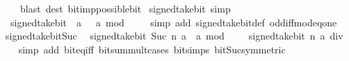 \begin{isabellebody}
\ \ \ \ {\isacharparenleft}{\kern0pt}blast\ dest{\isacharcolon}{\kern0pt}\ bit{\isacharunderscore}{\kern0pt}imp{\isacharunderscore}{\kern0pt}possible{\isacharunderscore}{\kern0pt}bit{\isacharparenright}{\kern0pt}%
\endisatagproof
{\isafoldproof}%
%
\isadelimproof
\isanewline
%
\endisadelimproof
\isanewline
{}\isamarkupfalse%
\ signed{\isacharunderscore}{\kern0pt}take{\isacharunderscore}{\kern0pt}bit{\isacharunderscore}{\kern0pt}{}\ {\isacharbrackleft}{\kern0pt}simp{\isacharbrackright}{\kern0pt}{\isacharcolon}{\kern0pt}\isanewline
\ \ {\isacartoucheopen}signed{\isacharunderscore}{\kern0pt}take{\isacharunderscore}{\kern0pt}bit\ {}\ a\ {\isacharequal}{\kern0pt}\ {\isacharminus}{\kern0pt}\ {\isacharparenleft}{\kern0pt}a\ mod\ {}{\isacharparenright}{\kern0pt}{\isacartoucheclose}\isanewline
%
\isadelimproof
\ \ %
\endisadelimproof
%
\isatagproof
{}\isamarkupfalse%
\ {\isacharparenleft}{\kern0pt}simp\ add{\isacharcolon}{\kern0pt}\ signed{\isacharunderscore}{\kern0pt}take{\isacharunderscore}{\kern0pt}bit{\isacharunderscore}{\kern0pt}def\ odd{\isacharunderscore}{\kern0pt}iff{\isacharunderscore}{\kern0pt}mod{\isacharunderscore}{\kern0pt}{}{\isacharunderscore}{\kern0pt}eq{\isacharunderscore}{\kern0pt}one{\isacharparenright}{\kern0pt}%
\endisatagproof
{\isafoldproof}%
%
\isadelimproof
\isanewline
%
\endisadelimproof
\isanewline
{}\isamarkupfalse%
\ signed{\isacharunderscore}{\kern0pt}take{\isacharunderscore}{\kern0pt}bit{\isacharunderscore}{\kern0pt}Suc{\isacharcolon}{\kern0pt}\isanewline
\ \ {\isacartoucheopen}signed{\isacharunderscore}{\kern0pt}take{\isacharunderscore}{\kern0pt}bit\ {\isacharparenleft}{\kern0pt}Suc\ n{\isacharparenright}{\kern0pt}\ a\ {\isacharequal}{\kern0pt}\ a\ mod\ {}\ {\isacharplus}{\kern0pt}\ {}\ {\isacharasterisk}{\kern0pt}\ signed{\isacharunderscore}{\kern0pt}take{\isacharunderscore}{\kern0pt}bit\ n\ {\isacharparenleft}{\kern0pt}a\ div\ {}{\isacharparenright}{\kern0pt}{\isacartoucheclose}\isanewline
%
\isadelimproof
\ \ %
\endisadelimproof
%
\isatagproof
{}\isamarkupfalse%
\ {\isacharparenleft}{\kern0pt}simp\ add{\isacharcolon}{\kern0pt}\ bit{\isacharunderscore}{\kern0pt}eq{\isacharunderscore}{\kern0pt}iff\ bit{\isacharunderscore}{\kern0pt}sum{\isacharunderscore}{\kern0pt}mult{\isacharunderscore}{\kern0pt}{}{\isacharunderscore}{\kern0pt}cases\ bit{\isacharunderscore}{\kern0pt}simps\ bit{\isacharunderscore}{\kern0pt}Suc{\isacharbrackleft}{\kern0pt}symmetric{\isacharbrackright}{\kern0pt}{\isacharparenright}{\kern0pt}\isanewline

\end{isabellebody}
